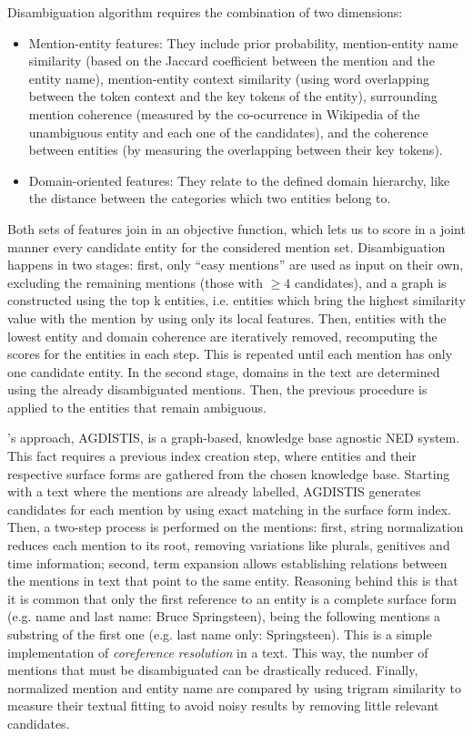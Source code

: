 Disambiguation algorithm requires the combination of two dimensions:
%
\begin{itemize}
\item Mention-entity features: They include prior probability, mention-entity name similarity (based on the Jaccard coefficient between the mention and the entity name), mention-entity context similarity (using word overlapping between the token context and the key tokens of the entity), surrounding mention coherence (measured by the co-ocurrence in Wikipedia of the unambiguous entity and each one of the candidates), and the coherence between entities (by measuring the overlapping between their key tokens).
\item Domain-oriented features: They relate to the defined domain hierarchy, like the distance between the categories which two entities belong to.
\end{itemize}
%
Both sets of features join in an objective function, which lets us to score in a joint manner every candidate entity for the considered mention set. Disambiguation happens in two stages: first, only ``easy mentions'' are used as input on their own, excluding the remaining mentions (those with $\geq4$ candidates), and a graph is constructed using the top k entities, i.e. entities which bring the highest similarity value with the mention by using only its local features. Then, entities with the lowest entity and domain coherence are iteratively removed, recomputing the scores for the entities in each step. This is repeated until each mention has only one candidate entity. In the second stage, domains in the text are determined using the already disambiguated mentions. Then, the previous procedure is applied to the entities that remain ambiguous.

\medskip

\cite{usbeck2014agnostic,usbeck2014graph}'s approach, AGDISTIS, is a graph-based, knowledge base agnostic NED system. This fact requires a previous index creation step, where entities and their respective surface forms are gathered from the chosen knowledge base. Starting with a text where the mentions are already labelled, AGDISTIS generates candidates for each mention by using exact matching in the surface form index. Then, a two-step process is performed on the mentions: first, string normalization reduces each mention to its root, removing variations like plurals, genitives and time information; second, term expansion allows establishing relations between the mentions in text that point to the same entity. Reasoning behind this is that it is common that only the first reference to an entity is a complete surface form (e.g. name and last name: Bruce Springsteen), being the following mentions a substring of the first one (e.g. last name only: Springsteen). This is a simple implementation of \emph{coreference resolution} in a text. This way, the number of mentions that must be disambiguated can be drastically reduced. Finally, normalized mention and entity name are compared by using trigram similarity to measure their textual fitting to avoid noisy results by removing little relevant candidates.

